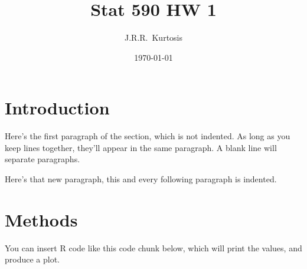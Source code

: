 \documentclass[letterpaper,12pt]{article}\usepackage[]{graphicx}\usepackage[]{color}
\title{Stat 590 HW 1}
\author{J.R.R.~Kurtosis}
\date{\today}
\begin{document}
\maketitle

\tableofcontents


\section{Introduction}
Here's the first paragraph of the section, which is not indented.
As long as you keep lines together, they'll appear in the same paragraph.
A blank line will separate paragraphs.

Here's that new paragraph, this and every following paragraph is indented.

\section{Methods}

You can insert R code like this code chunk below, which will print the values,
  and produce a plot.
\end{document}
